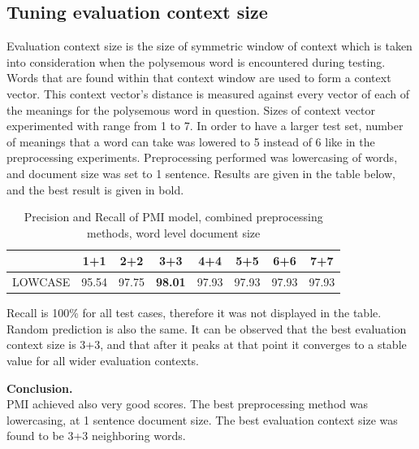 \subsection{Tuning evaluation context size}
Evaluation context size is the size of symmetric window of context which is taken into consideration 
when the polysemous word is encountered during testing. Words that are found within that context
window are used to form a context vector. This context vector's distance is measured against every
vector of each  of the meanings for the polysemous word in question. Sizes of context vector 
experimented with range from 1 to 7. In order to have a larger test set, number of meanings that 
a word can take was lowered to 5 instead of 6 like in the preprocessing experiments. Preprocessing
performed was lowercasing of words, and document size was set to 1 sentence. 
Results are given 
in the table below, and the best result is given in bold. 

\begin{table}[h!]
\begin{tabular}{ l | c c c c c c c}
    &  1+1 & 2+2 & 3+3 & 4+4 & 5+5 & 6+6 & 7+7 \\
\hline
LOWCASE  & 95.54 & 97.75 & \textbf{98.01} & 97.93 & 97.93 & 97.93 & 97.93 \\
\end{tabular}
\caption{Precision and Recall of PMI model,  combined preprocessing methods, word level document size}
\end{table} 

Recall is 100\% for all test cases, therefore it was not displayed in the table. Random prediction is also the same. 
It can be observed that the best evaluation context size is 3+3, and that after it peaks at that point it converges to a stable value for all wider evaluation contexts. 

\textbf{Conclusion.}\\
PMI achieved also very good scores. The best preprocessing method was lowercasing, at 1 sentence document size. The best evaluation context size was found to be 3+3 neighboring words. 


